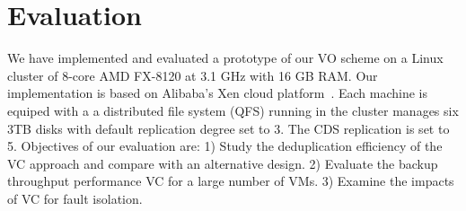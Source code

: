 
\section{Evaluation}
\label{sect:exper}

We have implemented and evaluated a prototype of our VO scheme on a Linux cluster
of 8-core AMD FX-8120 at 3.1 GHz with 16 GB RAM. 
Our implementation is based on Alibaba's Xen cloud platform~\cite{Aliyun,WeiZhangIEEE}.
Each machine  is equiped with a 
a distributed file system (QFS) running in the cluster manages six 3TB disks
with default replication degree set to 3. The CDS replication is set to 5.
Objectives of our evaluation are:
1) Study the deduplication efficiency of the VC approach and compare with an alternative
design.
2) Evaluate the backup throughput performance VC  for a large number of VMs.
3) Examine the impacts of VC for fault isolation. 


